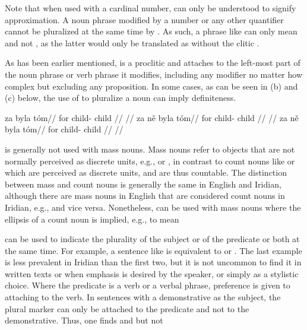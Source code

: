Note that when used with a cardinal number,  can only be understood to
signify approximation. A noun phrase modified by a number or any other
quantifier cannot be pluralized at the same time by . As such, a phrase
like  can only mean  and not
, as the latter would only be translated as 
without the clitic .

As has been earlier mentioned,  is a proclitic and
attaches to the left-most part of the noun phrase or verb phrase it modifies,
including any modifier no matter how complex but excluding any proposition. In
some cases, as can be seen in (b) and (c) below, the use of  to
pluralize a noun can imply definiteness.

\pex
\a
\begingl{}
     za byla tóm//
    \glb \Pl{} for child-\Acc{} child //
    \glft {}//
\endgl
\a
\begingl{}
    \gla za {ně} byla tóm//
    \glb for \Pl{} child-\Acc{} child //
    \glft {}//
\endgl
\a
\begingl{}
     za ně byla tóm//
    \glb \Pl{} for \Pl{} child-\Acc{} child //
    \glft {}//
\endgl
\xe

 is generally not used with mass nouns. Mass nouns
refer to objects that are not normally perceived as discrete units, e.g.,
 or , in contrast to count nouns like
 or  which are perceived as discrete units, and
are thus countable. The distinction between mass and count nouns is generally
the same in English and Iridian, although there are mass nouns in English that
are considered count nouns in Iridian, e.g.,  and vice
versa. Nonetheless,  can be used with mass nouns where the ellipsis of a
count noun is implied, e.g.,  to mean 

 can be used to indicate the plurality of the subject or of the
predicate or both at the same time. For example, a sentence like  is equivalent to  or . The last example is less prevalent in Iridian than the first
two, but it is not uncommon to find it in written texts or when emphasis is
desired by the speaker, or simply as a stylistic choice. Where the predicate is
a verb or a verbal phrase, preference is given to attaching  to the
verb.  In sentences with a demonstrative as the subject, the plural marker
 can only be attached to the predicate and not to the demonstrative.
Thus, one finds  and  but not 

